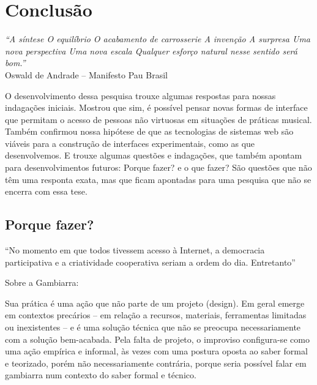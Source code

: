 
\chapter{Conclusão}
\label{ch:conclusao}
\begin{flushright}
\textit{``A síntese
O equilíbrio
O acabamento de carrosserie
A invenção
A surpresa
Uma nova perspectiva
Uma nova escala
Qualquer esforço natural nesse sentido será bom.''} \\
Oswald de Andrade – Manifesto Pau Brasil    
\end{flushright}

O desenvolvimento dessa pesquisa trouxe algumas respostas para nossas indagações iniciais. Mostrou que sim, é possível pensar novas formas de interface que permitam o acesso de pessoas não virtuosas em situações de práticas musical. Também confirmou nossa hipótese de que as tecnologias de sistemas web são viáveis para a construção de interfaces experimentais, como as que desenvolvemos. E trouxe algumas questões e indagações, que também apontam para desenvolvimentos futuros: Porque fazer? e o que fazer? São questões que não têm uma responta exata, mas que ficam apontadas para uma pesquisa que não se encerra com essa tese.


\section{Porque fazer?}


``No momento em que todos tivessem acesso à Internet, a democracia participativa e a criatividade cooperativa seriam a ordem do dia. Entretanto'' \cite[360]{Barbrook2009}


Sobre a Gambiarra:

\begin{citacao}
Sua prática é uma ação que não parte de um projeto (design). Em geral emerge em contextos precários – em relação a recursos, materiais, ferramentas limitadas ou inexistentes – e é uma solução técnica que não se preocupa necessariamente com a solução bem-acabada. Pela falta de projeto, o improviso configura-se como uma ação empírica e informal, às vezes com uma postura oposta ao saber formal e teorizado, porém não necessariamente contrária, porque seria possível falar em gambiarra num contexto do saber formal e técnico. \cite[7]{Obici2014}
\end{citacao}





